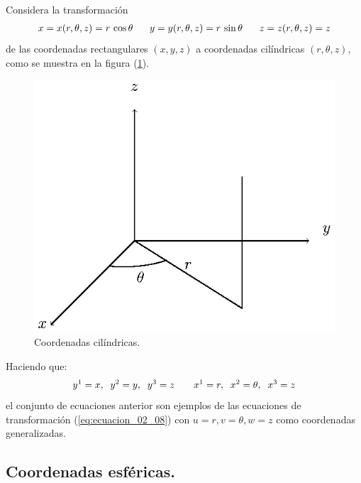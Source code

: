 Considera la transformación
\begin{align*}
x = x (r, \theta, z) = r \, \cos \theta \hspace{0.6cm} y = y (r, \theta, z) = r \, \sin \theta \hspace{0.6cm} z = z (r, \theta, z) = z
\end{align*}
de las coordenadas rectangulares $(x, y, z)$ a coordenadas cilíndricas $(r, \theta, z)$, como se muestra en la figura (\ref{fig:figura_02_02}). 
\begin{figure}[H]
    \centering
    \includegraphics[scale=1]{Imagenes/Sistema_Cilindrico.eps}
    \caption{Coordenadas cilíndricas.}
    \label{fig:figura_02_02}
\end{figure}
Haciendo que:
\begin{align*}
y^{1} = x, \hspace{0.2cm} y^{2} = y, \hspace{0.2cm} y^{3} = z \hspace{0.7cm} x^{1} = r, \hspace{0.2cm} x^{2} = \theta, \hspace{0.2cm} x^{3} = z
\end{align*}
el conjunto de ecuaciones anterior son ejemplos de las ecuaciones de transformación (\ref{eq:ecuacion_02_08}) con $u = r, v = \theta, w = z$ como coordenadas generalizadas.

\subsection{Coordenadas esféricas.}

